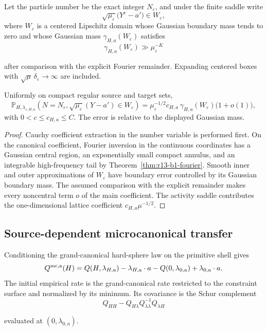 Let the particle number be the exact integer $N_\varepsilon$, and under the
finite saddle write
\[
 \sqrt{\mu_\varepsilon}\bigl(Y^\varepsilon-a'\bigr)\in W_\varepsilon,
\]
where $W_\varepsilon$ is a centered Lipschitz domain whose Gaussian boundary
mass tends to zero and whose Gaussian mass
$\gamma_{H,a}(W_\varepsilon)$ satisfies
\[
 \gamma_{H,a}(W_\varepsilon)
 \gg \mu_\varepsilon^{-K}
\]

after comparison with the explicit Fourier remainder.  Expanding centered
boxes with
$\sqrt\mu\,\delta_\varepsilon\to\infty$ are included.

\begin{theorem}
\label{thm:r13-b1-local}
Uniformly on compact regular source and target sets,
\[
 \mathbb P_{H,\lambda_{\varepsilon,H,a}}
 \left(N=N_\varepsilon,
 \sqrt{\mu_\varepsilon}(Y-a')\in W_\varepsilon\right)
 =\mu_\varepsilon^{-1/2}
 c_{H,a}\,\gamma_{H,a}(W_\varepsilon)
 \bigl(1+o(1)\bigr),
\]
with $0<c\le c_{H,a}\le C$.  The error is relative to the displayed Gaussian
mass.
\end{theorem}

\begin{proof}
Cauchy coefficient extraction in the number variable is performed first.  On
the canonical coefficient, Fourier inversion in the continuous coordinates
has a Gaussian central region, an exponentially small compact annulus, and an
integrable high-frequency tail by
Theorem~\ref{thm:r13-b1-fourier}.  Smooth inner and outer approximations of
$W_\varepsilon$ have boundary error controlled by its Gaussian boundary mass.
The assumed comparison with the explicit remainder makes every noncentral
term $o$ of the main coefficient.  The activity saddle contributes the
one-dimensional lattice coefficient $c_{H,a}\mu^{-1/2}$.
\end{proof}

\subsection{Source-dependent microcanonical transfer}

\begin{theorem}
\label{thm:r13-b1-transfer}
Conditioning the grand-canonical hard-sphere law on the primitive shell gives
\[
 Q^{\rm mc,a}(H)
 =Q(H,\lambda_{H,a})-\lambda_{H,a}\cdot a
  -Q(0,\lambda_{0,a})+\lambda_{0,a}\cdot a.
\]
The initial empirical rate is the grand-canonical rate restricted to the
constraint surface and normalized by its minimum.  Its covariance is the
Schur complement
\[
 Q_{HH}-Q_{H\lambda}Q_{\lambda\lambda}^{-1}Q_{\lambda H}
\]

evaluated at $(0,\lambda_{0,a})$.
\end{theorem}

